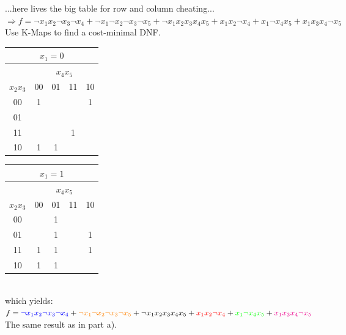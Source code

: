 \documentclass[10pt,a4paper]{scrartcl}
\newcommand{\subExercise}[1]{\vspace{0.5em} \noindent{\bf #1)}}
\begin{document}
...here lives the big table for row and column cheating...\\

$\Longrightarrow f = \neg x_1x_2\neg x_3\neg x_4+
                     \neg x_1\neg x_2\neg x_3\neg x_5+
                     \neg x_1x_2x_3x_4x_5+
                     x_1x_2\neg x_4+
                     x_1\neg x_4x_5+
                     x_1x_3x_4\neg x_5$\\


\subExercise{b}
Use K-Maps to find a cost-minimal DNF.\\
\begin{tabular}{|c||c|c|c|c|}
  \hline
  \multicolumn{5}{|c|}{$x_1=0$} \\ \hline
            & \multicolumn{4}{c|}{$x_4x_5$} \\
$x_2x_3$ & 00                  & 01                  & 11                 & 10                  \\ \hline\hline
    00   & \cellcolor{orange}1 &                     &                    & \cellcolor{orange}1 \\ \hline
    01   &                     &                     &                    &                     \\ \hline
    11   &                     &                     & 1                  &                     \\ \hline
    10   & \cellcolor{blue}1   & \cellcolor{blue}1   &                    &                     \\
  \hline
\end{tabular}
\begin{tabular}{|c||c|c|c|c|}
  \hline
  \multicolumn{5}{|c|}{$x_1=1$} \\ \hline
            & \multicolumn{4}{c|}{$x_4x_5$} \\
$x_2x_3$ & 00                  & 01                  & 11                 & 10                  \\ \hline\hline
    00   &                     & \cellcolor{green}1  &                    &                     \\ \hline
    01   &                     & \cellcolor{green}1  &                    & \cellcolor{magenta}1\\ \hline
    11   & \cellcolor{red}1    & \cellcolor{yellow}1 &                    & \cellcolor{magenta}1\\ \hline
    10   & \cellcolor{red}1    & \cellcolor{yellow}1 &                    &                     \\
  \hline
\end{tabular}\\[5mm]
which yields: $f   =  \textcolor{blue}{\neg x_1x_2\neg x_3\neg x_4}+
                      \textcolor{orange}{\neg x_1\neg x_2\neg x_3\neg x_5}+
                      \neg x_1x_2x_3x_4x_5+
                      \textcolor{red}{x_1x_2\neg x_4}+
                      \textcolor{green}{x_1\neg x_4x_5}+
                      \textcolor{magenta}{x_1x_3x_4\neg x_5}$\\
The same result as in part a).
\end{document}
